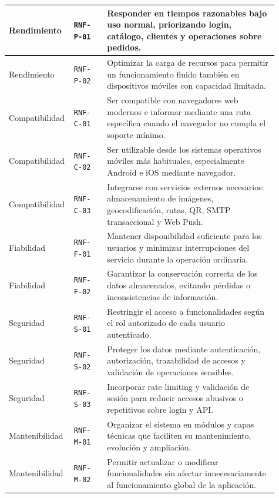 {\begin{supertabular}{|>{\raggedright\arraybackslash}p{0.17\linewidth}|>{\raggedright\arraybackslash}p{0.12\linewidth}|>{\raggedright\arraybackslash}p{0.62\linewidth}|}
\hline
{}
Rendimiento & \texttt{RNF-P-01} & Responder en tiempos razonables bajo uso normal, priorizando login, catálogo, clientes y operaciones sobre pedidos. \\
\hline
Rendimiento & \texttt{RNF-P-02} & Optimizar la carga de recursos para permitir un funcionamiento fluido también en dispositivos móviles con capacidad limitada. \\
\hline
{}
Compatibilidad & \texttt{RNF-C-01} & Ser compatible con navegadores web modernos e informar mediante una ruta específica cuando el navegador no cumpla el soporte mínimo. \\
\hline
Compatibilidad & \texttt{RNF-C-02} & Ser utilizable desde los sistemas operativos móviles más habituales, especialmente Android e iOS mediante navegador. \\
\hline
Compatibilidad & \texttt{RNF-C-03} & Integrarse con servicios externos necesarios: almacenamiento de imágenes, geocodificación, rutas, QR, SMTP transaccional y Web Push. \\
\hline
{}
Fiabilidad & \texttt{RNF-F-01} & Mantener disponibilidad suficiente para los usuarios y minimizar interrupciones del servicio durante la operación ordinaria. \\
\hline
Fiabilidad & \texttt{RNF-F-02} & Garantizar la conservación correcta de los datos almacenados, evitando pérdidas o inconsistencias de información. \\
\hline
{}
Seguridad & \texttt{RNF-S-01} & Restringir el acceso a funcionalidades según el rol autorizado de cada usuario autenticado. \\
\hline
Seguridad & \texttt{RNF-S-02} & Proteger los datos mediante autenticación, autorización, trazabilidad de accesos y validación de operaciones sensibles. \\
\hline
Seguridad & \texttt{RNF-S-03} & Incorporar rate limiting y validación de sesión para reducir accesos abusivos o repetitivos sobre login y API. \\
\hline
{}
Mantenibilidad & \texttt{RNF-M-01} & Organizar el sistema en módulos y capas técnicas que faciliten su mantenimiento, evolución y ampliación. \\
\hline
Mantenibilidad & \texttt{RNF-M-02} & Permitir actualizar o modificar funcionalidades sin afectar innecesariamente al funcionamiento global de la aplicación. \\

\end{supertabular}}
